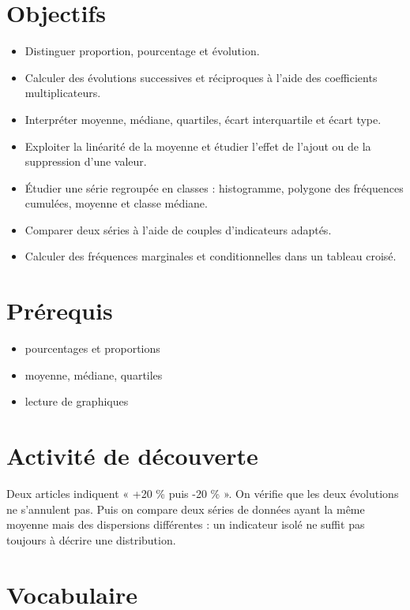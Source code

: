 \section{Objectifs}

\begin{itemize}
\item Distinguer proportion, pourcentage et évolution.
\item Calculer des évolutions successives et réciproques à l'aide des coefficients multiplicateurs.
\item Interpréter moyenne, médiane, quartiles, écart interquartile et écart type.
\item Exploiter la linéarité de la moyenne et étudier l'effet de l'ajout ou de la suppression d'une valeur.
\item Étudier une série regroupée en classes : histogramme, polygone des fréquences cumulées, moyenne et classe médiane.
\item Comparer deux séries à l'aide de couples d'indicateurs adaptés.
\item Calculer des fréquences marginales et conditionnelles dans un tableau croisé.
\end{itemize}

\section{Prérequis}

\begin{itemize}
\item pourcentages et proportions
\item moyenne, médiane, quartiles
\item lecture de graphiques
\end{itemize}

\section{Activité de découverte}

Deux articles indiquent « +20 \% puis -20 \% ». On vérifie que les deux évolutions ne s'annulent pas. Puis on compare deux séries de données ayant la même moyenne mais des dispersions différentes : un indicateur isolé ne suffit pas toujours à décrire une distribution.

\section{Vocabulaire}

